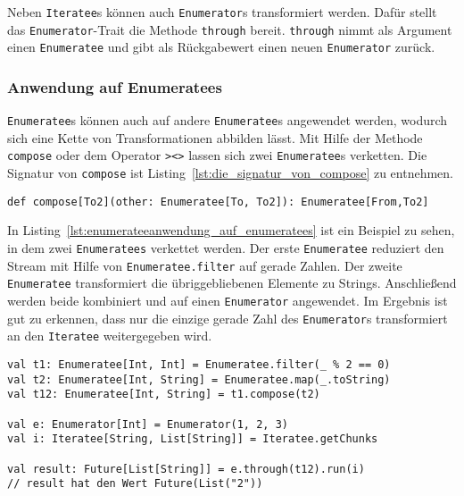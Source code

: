 Neben \lstinline|Iteratee|s können auch \lstinline|Enumerator|s transformiert werden.
Dafür stellt das \lstinline|Enumerator|-Trait die Methode \lstinline|through| bereit.
\lstinline|through| nimmt als Argument einen \lstinline|Enumeratee| und gibt als Rückgabewert einen neuen \lstinline|Enumerator| zurück.


\subsubsection{Anwendung auf Enumeratees} %
\label{ssub:enumerateeanwendung_auf_enumeratees}

\lstinline|Enumeratee|s können auch auf andere \lstinline|Enumeratee|s angewendet werden, wodurch sich eine Kette von Transformationen abbilden lässt.
Mit Hilfe der Methode \lstinline|compose| oder dem Operator \lstinline|><>| lassen sich zwei \lstinline|Enumeratee|s verketten.
Die Signatur von \lstinline|compose| ist Listing~\ref{lst:die_signatur_von_compose} zu entnehmen.
\begin{lstlisting}[caption=Die Signatur von compose, label=lst:die_signatur_von_compose]
def compose[To2](other: Enumeratee[To, To2]): Enumeratee[From,To2]
\end{lstlisting}

In Listing~\ref{lst:enumerateeanwendung_auf_enumeratees} ist ein Beispiel zu sehen, in dem zwei \lstinline|Enumeratees| verkettet werden.
Der erste \lstinline|Enumeratee| reduziert den Stream mit Hilfe von \lstinline|Enumeratee.filter| auf gerade Zahlen.
Der zweite \lstinline|Enumeratee| transformiert die übriggebliebenen Elemente zu Strings.
Anschließend werden beide kombiniert und auf einen \lstinline|Enumerator| angewendet.
Im Ergebnis ist gut zu erkennen, dass nur die einzige gerade Zahl des \lstinline|Enumerator|s transformiert an den \lstinline|Iteratee| weitergegeben wird.

\begin{lstlisting}[caption=Enumerateeanwendung auf Enumeratees, label=lst:enumerateeanwendung_auf_enumeratees]
val t1: Enumeratee[Int, Int] = Enumeratee.filter(_ % 2 == 0)
val t2: Enumeratee[Int, String] = Enumeratee.map(_.toString)
val t12: Enumeratee[Int, String] = t1.compose(t2)

val e: Enumerator[Int] = Enumerator(1, 2, 3)
val i: Iteratee[String, List[String]] = Iteratee.getChunks

val result: Future[List[String]] = e.through(t12).run(i)
// result hat den Wert Future(List("2"))
\end{lstlisting}

